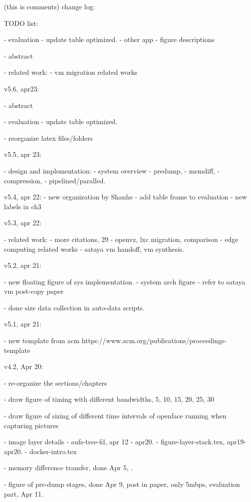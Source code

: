 
\iffalse
(this is comments) change log:

TODO list:

 - evaluation
     - update table optimized.
     - other app
     - figure descriptions
    
 - abstract
 
 - related work:
    - vm migration related works

v5.6, apr23:
    
 - abstract
 
 - evaluation
     - update table optimized.
     
 - reorganize latex files/folders
 
v5.5, apr 23:

    - design and implementation:
        - system overview
        - predump, 
        - memdiff, 
        - compression, 
        - pipelined/paralled.

v5.4, apr 22:
    - new organization by Shanhe
    - add table frame to evaluation
    - new labels in ch3
    
v5.3, apr 22:

 - related work:
    - more citations, 29
    - openvz, lxc migration, comparison
    - edge computing related works
    - sataya vm handoff, vm synthesis. 
    


v5.2, apr 21:

 - new floating figure of sys implementation.
    - system arch figure
    - refer to sataya vm post-copy paper
    
 - done size data collection in auto-data scripts.

v5.1, apr 21:

 - new template from acm
    https://www.acm.org/publications/proceedings-template
 
v4.2, Apr 20: 

 - re-organize the sections/chapters
 
 - draw figure of timing with different bandwidths, 5, 10, 15, 20, 25, 30
 
 - draw figure of sizing of different time intervals of openface running when capturing pictures
 
 - image layer details
    - aufs-tree-fd, apr 12 - apr20.
    - figure-layer-stack.tex, apr19-apr20.
    - docker-intro.tex
 
 - memory difference transfer, done Apr 5, .
 
 - figure of pre-dump stages, done Apr 9, post in paper, only 5mbps, evaluation part, Apr 11.
 
